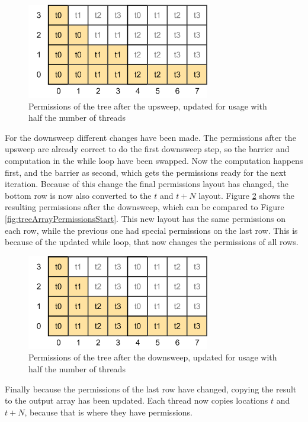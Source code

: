 \documentclass[a4paper]{article}
\begin{document}
\begin{figure}[htb!]
	\centering
	\includegraphics[width=80mm]{../images/tree-permissions-middle-halfthreads-v1.png}
	\caption{Permissions of the tree after the upsweep, updated for usage with half the number of threads}
	\label{fig:treeArrayPermissionsMiddleHalfThreads}
\end{figure}
\FloatBarrier

For the downsweep different changes have been made. The permissions after the upsweep are already correct to do the first downsweep step, so the barrier and computation in the while loop have been swapped. Now the computation happens first, and the barrier as second, which gets the permissions ready for the next iteration. Because of this change the final permissions layout has changed, the bottom row is now also converted to the $t$ and $t+N$ layout. Figure \ref{fig:treeArrayPermissionsEndHalfThreads} shows the resulting permissions after the downsweep, which can be compared to Figure \ref{fig:treeArrayPermissionsStart}. This new layout has the same permissions on each row, while the previous one had special permissions on the last row. This is because of the updated while loop, that now changes the permissions of all rows.

\begin{figure}[htb!]
	\centering
	\includegraphics[width=80mm]{../images/tree-permissions-end-halfthreads-v1.png}
	\caption{Permissions of the tree after the downsweep, updated for usage with half the number of threads}
	\label{fig:treeArrayPermissionsEndHalfThreads}
\end{figure}
\FloatBarrier

Finally because the permissions of the last row have changed, copying the result to the output array has been updated. Each thread now copies locations $t$ and $t+N$, because that is where they have permissions.
\end{document}
